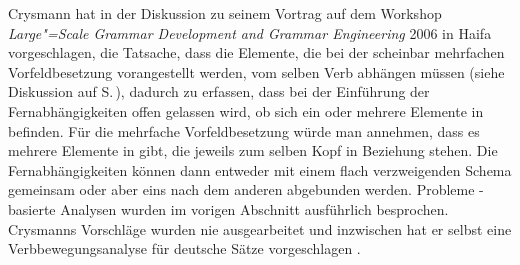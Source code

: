 \begin{exe}
\begin{xlist}
Crysmann hat in der Diskussion zu seinem Vortrag auf dem Workshop \emph{Large"=Scale Grammar Development and Grammar Engineering} 
2006 in Haifa vorgeschlagen, die Tatsache, dass die Elemente, die bei der scheinbar mehrfachen Vorfeldbesetzung
vorangestellt werden, vom selben Verb abhängen müssen (siehe Diskussion auf S.\,\pageref{ex-mult-front-same-verb}), dadurch zu erfassen, dass bei der Einführung
der Fernabhängigkeiten offen gelassen wird, ob sich ein oder mehrere Elemente in \slasch befinden.
Für die mehrfache Vorfeldbesetzung würde man annehmen, dass es mehrere Elemente in \slasch gibt,
die jeweils zum selben Kopf in Beziehung stehen. Die Fernabhängigkeiten können dann entweder mit einem
flach verzweigenden Schema gemeinsam oder aber eins nach dem anderen abgebunden werden. Probleme
\slasch-basierte Analysen wurden im vorigen Abschnitt ausführlich besprochen.
Crysmanns Vorschläge wurden nie ausgearbeitet und inzwischen hat er selbst eine Verbbewegungsanalyse
für deutsche Sätze vorgeschlagen \citep{Crysmann2022a}.
%

\end{xlist}
\end{exe}
